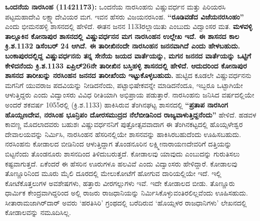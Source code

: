 \textbf{ಒಂದನೆಯ ನಾರಸಿಂಹ (1142\general{\enginline{-}}1173):} ಒಂದನೆಯ ನಾರಸಿಂಹನು ವಿಷ್ಣುವರ್ಧನ ಮತ್ತು ಪಿರಿಯರಸಿ ಪಟ್ಟಮಹಾದೇವಿ ಲಕ್ಷ್ಮಾದೇವಿಯರ ಮಗ. ಇವನ ಹೆಸರು ವಿಜಯನರಸಿಂಹ. \textbf{“ರೂಡಿವಡೆದ ವಿಜೆಯನರಸಿಂಹಂ”} ಎಂದು ಭೀಮನಹಳ್ಳಿ ಶಾಸನದಲ್ಲಿ ಹೇಳಿದೆ. ಈತನ ಜನನ 1133ರಲ್ಲಾಯಿತು ಎಂಬುದು ವಿದ್ವಾಂಸರ ಮತ.\textbf{ ಮಳವಳ್ಳಿ ತಾಲ್ಲೂಕಿನ ಕೋನಾಪುರ ಶಾಸನದಲ್ಲಿ ವಿಷ್ಣುವರ್ಧನನ ಮಗ ನಾರಸಿಂಹನ ಉಲ್ಲೇಖ ಇದೆ. ಈ ಶಾಸನದ ಕಾಲ ಕ್ರಿ.ಶ.1132 ಡಿಸೆಂಬರ್​ 24 ಆಗಿದೆ. ಈ ತಾರೀಖಿನಂದೇ ನಾರಸಿಂಹನ ಜನನವಾಗಿದೆ ಎಂದು ಹೇಳಬಹುದು.} \textbf{ಬಂಕಾಪುರದಲ್ಲಿದ್ದ ವಿಷ್ಣುವರ್ಧನನು ತನ್ನ ಸೇನೆಯ ಜಯದ ವಾರ್ತೆಯನ್ನು, ಮಗನ ಜನನದ ವಾರ್ತೆಯನ್ನು ಒಟ್ಟಿಗೆ ಕೇಳಿದನೆಂದು ಕ್ರಿ.ಶ.1133 ಏಪ್ರಿಲ್​ 26ನೇ ತಾರೀಖಿನ ಬಸ್ತಿಹಳ್ಳಿ ಶಾಸನದಲ್ಲಿ ಹೇಳಿದೆ. ಆದುದರಿಂದ ಕೋನಾಪುರ ಶಾಸನದ ತಾರೀಖನ್ನು ನರಸಿಂಹನ ಜನನದ ತಾರೀಖೆಂದು ಇಟ್ಟುಕೊಳ್ಳಬಹುದು.} ಹುಟ್ಟಿದ ಕೂಡಲೇ ವಿಷ್ಣುವರ್ಧನನು ಮಗನಿಗೆ ಯುವರಾಜ ಪದವಿಯನ್ನು ನೀಡಿದನೆಂದು, ಪಟ್ಟಾಭಿಷೇಕವನ್ನೇ ಮಾಡಿದನೆಂದೂ, ಇಬ್ಬರೂ ಒಟ್ಟಾಗಿಯೇ ಆಳುತ್ತಿದ್ದರು ಎಂದು ವಿದ್ವಾಂಸರು ವಿವಿಧ ರೀತಿಯಾಗಿ ಅಭಿಪ್ರಾಯ ಪಡುತ್ತಾರೆ. ನಾರಸಿಂಹನು ಜನಿಸಿದ ವರ್ಷದಲ್ಲಿಯೇ ಅಂದರೆ ಶಕವರ್ಷ 1055ರಲ್ಲಿ (ಕ್ರಿ.ಶ.1133) ಹಾಕಿಸಿರುವ ತೆಂಗಿನಘಟ್ಟ ಶಾಸನದಲ್ಲಿ \textbf{“ಪ್ರತಾಪ ನಾರಸಿಂಗ ಹೊಯ್ಸಣದೇವ, ನರಸಿಂಹ ಭೂನ್ರಿಪಂ ದೋರಸಮುದ್ರದ ನೆಲೆಬೀಡಿನಿಂದ ರಾಜ್ಯವಾಳುತ್ತಿದ್ದನೆಂದು”} ಹೇಳಿದೆ. ಹಡವಳ ಕಾವಣ್ಣ ಮೊದಲಾದವರು ಬಹುಶಃ ವಿಷ್ಣುವರ್ಧನನಿಗೆ ಪುತ್ರೋತ್ಸವವಾದಾಗ ಈ ತೆಂಗಿನಕಟ್ಟದಲ್ಲಿ ಹೊಯ್ಸಳೇಶ್ವರ ದೇವಾಲಯವನ್ನು ನಿರ್ಮಿಸಿ, ನಾರಸಿಂಹನ ಹೆಸರಿನಲ್ಲಿಯೇ ಶಾಸನವನ್ನು ಹಾಕಿಸಿರಬಹುದೆಂದು ಊಹಿಸಬಹುದು. ನರಸಿಂಹನು ಕೋಡಾಲದ ಬೀಡಿನಿಂದ ಆಳುತ್ತಿದ್ದಾಗ ತೊಂಡನೂರಿನ ಲಕ್ಷ್ಮೀನಾರಾಯಣದೇವರಿಗೆ ದತ್ತಿಯನ್ನು ಬಿಟ್ಟನೆಂದು ತೊಂಡನೂರು ಶಾಸನದಿಂದ ತಿಳಿದುಬರುತ್ತದೆ. ಕೋಡಾಲವು ಯಾವುದು ಎಂಬುದನ್ನು ಗುರುತಿಸಲು ಕಷ್ಟವಾಗುತ್ತದೆ. ಏಕೆಂದರೆ ಈ ಹೆಸರಿನ ಊರುಗಳೂ ಹಲವಿವೆ ಎಂದು ವಿದ್ವಾಂಸರು ಹೇಳಿದ್ದಾರೆ. ಕೋಡಾಲವು ತೊಣ್ಣೂರಿನಿಂದ ಮೂರು ಮೈಲಿ ದೂರದಲ್ಲಿ ಮೇಲುಕೋಟೆಗೆ ಹೋಗುವ ದಾರಿಯಲ್ಲಿಯೇ ಇದೆ. ಇಲ್ಲಿ ಕೋಟೆಕೊತ್ತಲುಗಳ ಅವಶೇಷಗಳು, ಹತ್ತಾರು ವೀರಗಲ್ಲುಗಳು ಇವೆ. ಇದೇ ಕೋಡಾಲದ ಬೀಡು. ತೊಣ್ಣೂರು ಧಾರ್ಮಿಕ ಕೇಂದ್ರವಾಗಿದ್ದರಿಂದ ಅಲ್ಲಿ ರಾಜರು ರಾಜಧಾನಿಯನ್ನು ನಿರ್ಮಿಸಿಕೊಳ್ಳುವಂತಿರ\-ಲಿಲ್ಲವೆಂದು ಊಹಿಸಹುದು. ಸೀತಾರಾಮಜಾಗಿರ್​ದಾರ್​ ಅವರು ‘ಹರತಿಸಿರಿ’ ಗ್ರಂಥದಲ್ಲಿ ಬರೆದಿರುವ ‘ಹೊಯ್ಸಳರ ರಾಜಧಾನಿಗಳು’ ಲೇಖನದಲ್ಲಿ ಕೋಡಾಲವನ್ನು ನಮೂದಿಸಿಲ್ಲ.

